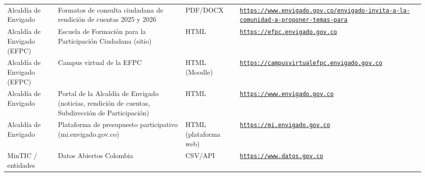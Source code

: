\documentclass[11pt,letterpaper]{article}
\begin{document}
{\begin{xltabular}{\linewidth}{L{2.8cm}YL{1.6cm}Y}
Alcaldía de Envigado & Formatos de consulta ciudadana de rendición de cuentas 2025 y 2026 & PDF/\allowbreak{}DOCX & \texttt{\footnotesize \href{https://www.envigado.gov.co/envigado-invita-a-la-comunidad-a-proponer-temas-para}{https:/\allowbreak{}}\allowbreak{}\href{https://www.envigado.gov.co/envigado-invita-a-la-comunidad-a-proponer-temas-para}{/\allowbreak{}}\allowbreak{}\href{https://www.envigado.gov.co/envigado-invita-a-la-comunidad-a-proponer-temas-para}{www.\allowbreak{}envigado.\allowbreak{}gov.\allowbreak{}co/\allowbreak{}}\allowbreak{}\href{https://www.envigado.gov.co/envigado-invita-a-la-comunidad-a-proponer-temas-para}{envigado-\allowbreak{}invita-\allowbreak{}a-\allowbreak{}la-\allowbreak{}comunidad-\allowbreak{}a-\allowbreak{}proponer-\allowbreak{}temas-\allowbreak{}para}} \\
Alcaldía de Envigado (EFPC) & Escuela de Formación para la Participación Ciudadana (sitio) & HTML & \texttt{\footnotesize \href{https://efpc.envigado.gov.co}{https:/\allowbreak{}}\allowbreak{}\href{https://efpc.envigado.gov.co}{/\allowbreak{}}\allowbreak{}\href{https://efpc.envigado.gov.co}{efpc.\allowbreak{}envigado.\allowbreak{}gov.\allowbreak{}co}} \\
Alcaldía de Envigado (EFPC) & Campus virtual de la EFPC & HTML (Moodle) & \texttt{\footnotesize \href{https://campusvirtualefpc.envigado.gov.co}{https:/\allowbreak{}}\allowbreak{}\href{https://campusvirtualefpc.envigado.gov.co}{/\allowbreak{}}\allowbreak{}\href{https://campusvirtualefpc.envigado.gov.co}{campusvirtua\allowbreak{}lefpc.\allowbreak{}envigado.\allowbreak{}gov.\allowbreak{}co}} \\
Alcaldía de Envigado & Portal de la Alcaldía de Envigado (noticias, rendición de cuentas, Subdirección de Participación) & HTML & \texttt{\footnotesize \href{https://www.envigado.gov.co}{https:/\allowbreak{}}\allowbreak{}\href{https://www.envigado.gov.co}{/\allowbreak{}}\allowbreak{}\href{https://www.envigado.gov.co}{www.\allowbreak{}envigado.\allowbreak{}gov.\allowbreak{}co}} \\
Alcaldía de Envigado & Plataforma de presupuesto participativo (mi.\allowbreak{}envigado.\allowbreak{}gov.\allowbreak{}co) & HTML (plataforma web) & \texttt{\footnotesize \href{https://mi.envigado.gov.co}{https:/\allowbreak{}}\allowbreak{}\href{https://mi.envigado.gov.co}{/\allowbreak{}}\allowbreak{}\href{https://mi.envigado.gov.co}{mi.\allowbreak{}envigado.\allowbreak{}gov.\allowbreak{}co}} \\
MinTIC /\allowbreak{} entidades & Datos Abiertos Colombia & CSV/\allowbreak{}API & \texttt{\footnotesize \href{https://www.datos.gov.co}{https:/\allowbreak{}}\allowbreak{}\href{https://www.datos.gov.co}{/\allowbreak{}}\allowbreak{}\href{https://www.datos.gov.co}{www.\allowbreak{}datos.\allowbreak{}gov.\allowbreak{}co}} \\

\end{xltabular}}
\end{document}
